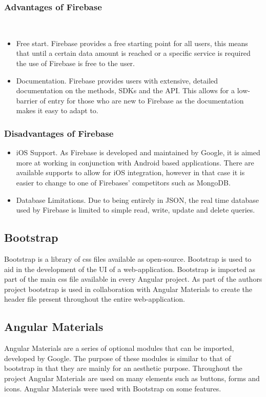 \subsubsection{Advantages of Firebase}\\
\begin{itemize}
    \item Free start. Firebase provides a free starting point for all users, this means that until a certain data amount is reached or a specific service is required the use of Firebase is free to the user. 
    \item Documentation. Firebase provides users with extensive, detailed documentation on the methods, SDKs and the API. This allows for a low-barrier of entry for those who are new to Firebase as the documentation makes it easy to adapt to.
\end{itemize}

\subsubsection{Disadvantages of Firebase}
\begin{itemize}
    \item iOS Support. As Firebase is developed and maintained by Google, it is aimed more at working in conjunction with Android based applications. There are available supports to allow for iOS integration, however in that case it is easier to change to one of Firebases' competitors such as MongoDB.
    \item Database Limitations. Due to being entirely in JSON, the real time database used by Firebase is limited to simple read, write, update and delete queries. 
\end{itemize}

\subsection{Bootstrap}
Bootstrap is a library of css files available as open-source. Bootstrap is used to aid in the development of the UI of a web-application. Bootstrap is imported as part of the main css file available in every Angular project. As part of the authors project bootstrap is used in collaboration with Angular Materials to create the header file present throughout the entire web-application.

\subsection{Angular Materials}
Angular Materials are a series of optional modules that can be imported, developed by Google. The purpose of these modules is similar to that of bootstrap in that they are mainly for an aesthetic purpose. Throughout the project Angular Materials are used on many elements such as buttons, forms and icons. Angular Materials were used with Bootstrap on some features. 

